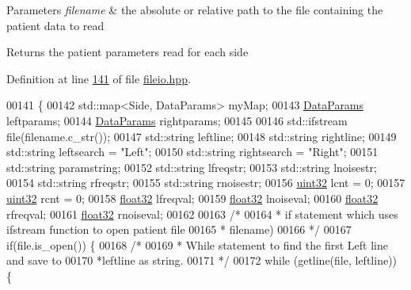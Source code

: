 \begin{DoxyParams}{Parameters}
{\em filename} & the absolute or relative path to the file containing the patient data to read\\
\hline
\end{DoxyParams}
\begin{DoxyReturn}{Returns}
the patient parameters read for each side 
\end{DoxyReturn}


Definition at line \hyperlink{fileio_8hpp_source_l00141}{141} of file \hyperlink{fileio_8hpp_source}{fileio.\+hpp}.


\begin{DoxyCode}
00141                                                        \{
00142         std::map<Side, DataParams> myMap;
00143         \hyperlink{structDataParams}{DataParams} leftparams;
00144         \hyperlink{structDataParams}{DataParams} rightparams;
00145 
00146         std::ifstream file(filename.c\_str());
00147         std::string leftline;
00148         std::string rightline;
00149         std::string leftsearch = \textcolor{stringliteral}{"Left"};
00150         std::string rightsearch = \textcolor{stringliteral}{"Right"};
00151         std::string paramstring;
00152         std::string lfreqstr;
00153         std::string lnoisestr;
00154         std::string rfreqstr;
00155         std::string rnoisestr;
00156         \hyperlink{definitions_8hpp_a1134b580f8da4de94ca6b1de4d37975e}{uint32} lcnt = 0;
00157         \hyperlink{definitions_8hpp_a1134b580f8da4de94ca6b1de4d37975e}{uint32} rcnt = 0;
00158         \hyperlink{definitions_8hpp_aacdc525d6f7bddb3ae95d5c311bd06a1}{float32} lfreqval;
00159         \hyperlink{definitions_8hpp_aacdc525d6f7bddb3ae95d5c311bd06a1}{float32} lnoiseval;
00160         \hyperlink{definitions_8hpp_aacdc525d6f7bddb3ae95d5c311bd06a1}{float32} rfreqval;
00161         \hyperlink{definitions_8hpp_aacdc525d6f7bddb3ae95d5c311bd06a1}{float32} rnoiseval;
00162 
00163         \textcolor{comment}{/*}
00164 \textcolor{comment}{         * if statement which uses ifstream function to open patient file }
00165 \textcolor{comment}{         * filename)}
00166 \textcolor{comment}{         */}
00167         \textcolor{keywordflow}{if}(file.is\_open()) \{
00168             \textcolor{comment}{/*}
00169 \textcolor{comment}{             * While statement to find the first Left line and save to }
00170 \textcolor{comment}{             *leftline as string.}
00171 \textcolor{comment}{             */}
00172             \textcolor{keywordflow}{while} (getline(file, leftline)) \{

\end{DoxyCode}
